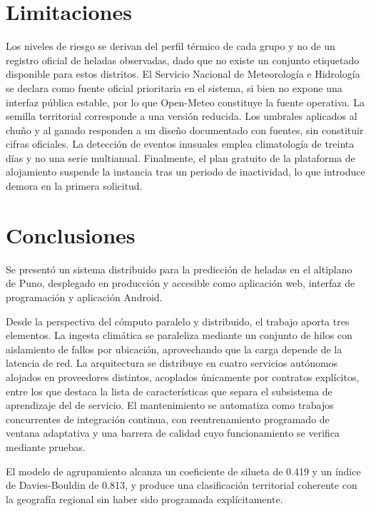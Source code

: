 \documentclass[conference]{IEEEtran}
\begin{document}
\section{Limitaciones}

Los niveles de riesgo se derivan del perfil t\'ermico de cada grupo y no de un
registro oficial de heladas observadas, dado que no existe un conjunto
etiquetado disponible para estos distritos. El Servicio Nacional de
Meteorolog\'ia e Hidrolog\'ia se declara como fuente oficial prioritaria en el
sistema, si bien no expone una interfaz p\'ublica estable, por lo que Open-Meteo
constituye la fuente operativa. La semilla territorial corresponde a una
versi\'on reducida. Los umbrales aplicados al chu\~no y al ganado responden a un
dise\~no documentado con fuentes, sin constituir cifras oficiales. La detecci\'on
de eventos inusuales emplea climatolog\'ia de treinta d\'ias y no una serie
multianual. Finalmente, el plan gratuito de la plataforma de alojamiento
suspende la instancia tras un periodo de inactividad, lo que introduce demora en
la primera solicitud.

\section{Conclusiones}

Se present\'o un sistema distribuido para la predicci\'on de heladas en el
altiplano de Puno, desplegado en producci\'on y accesible como aplicaci\'on web,
interfaz de programaci\'on y aplicaci\'on Android.

Desde la perspectiva del c\'omputo paralelo y distribuido, el trabajo aporta tres
elementos. La ingesta clim\'atica se paraleliza mediante un conjunto de hilos con
aislamiento de fallos por ubicaci\'on, aprovechando que la carga depende de la
latencia de red. La arquitectura se distribuye en cuatro servicios aut\'onomos
alojados en proveedores distintos, acoplados \'unicamente por contratos
expl\'icitos, entre los que destaca la lista de caracter\'isticas que separa el
subsistema de aprendizaje del de servicio. El mantenimiento se automatiza como
trabajos concurrentes de integraci\'on continua, con reentrenamiento programado
de ventana adaptativa y una barrera de calidad cuyo funcionamiento se verifica
mediante pruebas.

El modelo de agrupamiento alcanza un coeficiente de silueta de 0.419 y un
\'indice de Davies-Bouldin de 0.813, y produce una clasificaci\'on territorial
coherente con la geograf\'ia regional sin haber sido programada expl\'icitamente.
\end{document}
